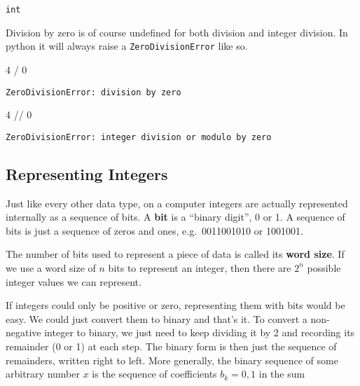 \documentclass[
  letterpaper,
  DIV=11,
  numbers=noendperiod]{scrreprt}
\newenvironment{Shaded}{\begin{snugshade}}{\end{snugshade}}
\newcommand{\DecValTok}[1]{\textcolor[rgb]{0.68,0.00,0.00}{#1}}
\newcommand{\OperatorTok}[1]{\textcolor[rgb]{0.37,0.37,0.37}{#1}}
\begin{document}
\begin{verbatim}
int
\end{verbatim}

Division by zero is of course undefined for both division and integer
division. In python it will always raise a \texttt{ZeroDivisionError}
like so.

\begin{Shaded}
\begin{Highlighting}[]
\DecValTok{4} \OperatorTok{/} \DecValTok{0}
\end{Highlighting}
\end{Shaded}

\begin{verbatim}
ZeroDivisionError: division by zero
\end{verbatim}

\begin{Shaded}
\begin{Highlighting}[]
\DecValTok{4} \OperatorTok{//} \DecValTok{0}
\end{Highlighting}
\end{Shaded}

\begin{verbatim}
ZeroDivisionError: integer division or modulo by zero
\end{verbatim}

\hypertarget{representing-integers}{%
\subsection{Representing Integers}\label{representing-integers}}

Just like every other data type, on a computer integers are actually
represented internally as a sequence of bits. A \textbf{bit} is a
``binary digit'', 0 or 1. A sequence of bits is just a sequence of zeros
and ones, e.g.~0011001010 or 1001001.

The number of bits used to represent a piece of data is called its
\textbf{word size}. If we use a word size of \(n\) bits to represent an
integer, then there are \(2^n\) possible integer values we can
represent.

If integers could only be positive or zero, representing them with bits
would be easy. We could just convert them to binary and that's it. To
convert a non-negative integer to binary, we just need to keep dividing
it by 2 and recording its remainder (0 or 1) at each step. The binary
form is then just the sequence of remainders, written right to left.
More generally, the binary sequence of some arbitrary number \(x\) is
the sequence of coefficients \(b_k=0,1\) in the sum
\end{document}
